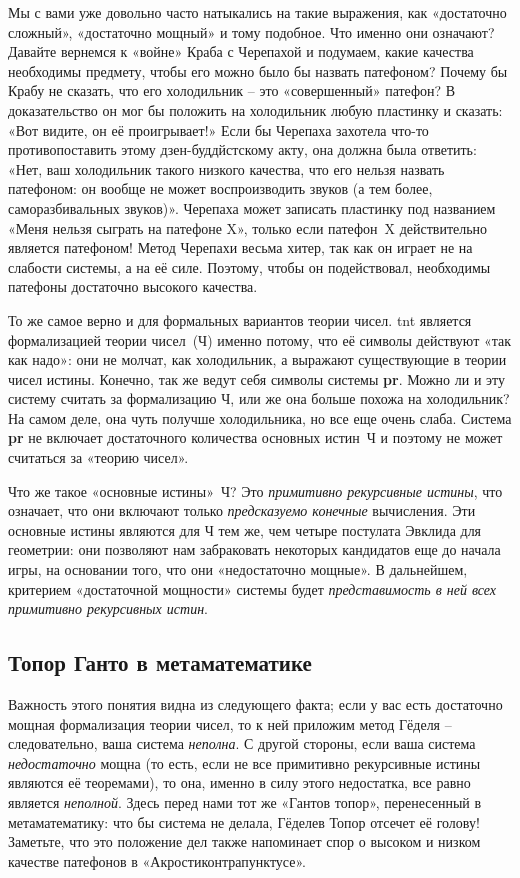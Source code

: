 \documentclass[../main.tex]{subfiles}
\begin{document}
Мы с вами уже довольно часто натыкались на такие выражения, как «достаточно сложный», «достаточно мощный» и тому подобное. Что именно они означают? Давайте вернемся к «войне» Краба с Черепахой и подумаем, какие качества необходимы предмету, чтобы его можно было бы назвать патефоном? Почему бы Крабу не сказать, что его холодильник \--- это «совершенный» патефон? В доказательство он мог бы положить на холодильник любую пластинку и сказать: «Вот видите, он её проигрывает!» Если бы Черепаха захотела что-то противопоставить этому дзен-буддйстскому акту, она должна была ответить: «Нет, ваш холодильник такого низкого качества, что его нельзя назвать патефоном: он вообще не может воспроизводить звуков (а тем более, саморазбивальных звуков)». Черепаха может записать пластинку под названием «Меня нельзя сыграть на патефоне X», только если патефон~X действительно является патефоном! Метод Черепахи весьма хитер, так как он играет не на слабости системы, а на её силе. Поэтому, чтобы он подействовал, необходимы патефоны достаточно высокого качества.

То же самое верно и для формальных вариантов теории чисел. \acs{tnt} является формализацией теории чисел~(Ч) именно потому, что её символы действуют «так как надо»: они не молчат, как холодильник, а выражают существующие в теории чисел истины. Конечно, так же ведут себя символы системы \textbf{pr}. Можно ли и эту систему считать за формализацию Ч, или же она больше похожа на холодильник? На самом деле, она чуть получше холодильника, но все еще очень слаба. Система \textbf{pr} не включает достаточного количества основных истин~Ч и поэтому не может считаться за «теорию чисел».

Что же такое «основные истины»~Ч? Это \emph{примитивно рекурсивные истины}, что означает, что они включают только \emph{предсказуемо конечные} вычисления. Эти основные истины являются для Ч тем же, чем четыре постулата Эвклида для геометрии: они позволяют нам забраковать некоторых кандидатов еще до начала игры, на основании того, что они «недостаточно мощные». В дальнейшем, критерием «достаточной мощности» системы будет \emph{представимость в ней всех примитивно рекурсивных истин}.


\subsection{Топор Ганто в метаматематике}

Важность этого понятия видна из следующего факта; если у вас есть достаточно мощная формализация теории чисел, то к ней приложим метод Гёделя \--- следовательно, ваша система \emph{неполна}. С другой стороны, если ваша система \emph{недостаточно} мощна (то есть, если не все примитивно рекурсивные истины являются её теоремами), то она, именно в силу этого недостатка, все равно является \emph{неполной}. Здесь перед нами тот же «Гантов топор», перенесенный в метаматематику: что бы система не делала, Гёделев Топор отсечет её голову! Заметьте, что это положение дел также напоминает спор о высоком и низком качестве патефонов в «Акростиконтрапунктусе».
\end{document}
